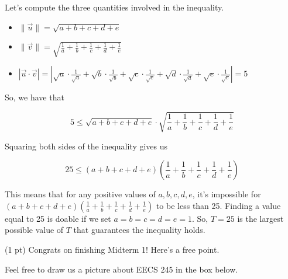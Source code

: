 \documentclass[11pt]{article}
\begin{document}
\begin{prob}
\begin{solution}
Let's compute the three quantities involved in the inequality.

\begin{itemize}
  \item $\lVert \vec u \rVert = \sqrt{a + b + c + d + e}$
  \item $\lVert \vec v \rVert = \sqrt{\frac{1}{a} + \frac{1}{b} + \frac{1}{c} + \frac{1}{d} + \frac{1}{e}}$
  \item $|\vec u \cdot \vec v| = |\sqrt{a} \cdot \frac{1}{\sqrt{a}} + \sqrt{b} \cdot \frac{1}{\sqrt{b}} + \sqrt{c} \cdot \frac{1}{\sqrt{c}} + \sqrt{d} \cdot \frac{1}{\sqrt{d}} + \sqrt{e} \cdot \frac{1}{\sqrt{e}}| = 5$
\end{itemize}

So, we have that

$$5 \leq \sqrt{a + b + c + d + e} \cdot \sqrt{\frac{1}{a} + \frac{1}{b} + \frac{1}{c} + \frac{1}{d} + \frac{1}{e}}$$

Squaring both sides of the inequality gives us

$$25 \leq (a + b + c + d + e) \left( \frac{1}{a} + \frac{1}{b} + \frac{1}{c} + \frac{1}{d} + \frac{1}{e} \right)$$

This means that for any positive values of $a, b, c, d, e$, it's impossible for $(a + b + c + d + e) \left( \frac{1}{a} + \frac{1}{b} + \frac{1}{c} + \frac{1}{d} + \frac{1}{e} \right)$ to be less than 25. Finding a value equal to 25 is doable if we set $a = b = c = d = e = 1$. So, $T = 25$ is the largest possible value of $T$ that guarantees the inequality holds.

\end{solution}

\end{prob}

\newpage

(1 pt) Congrats on finishing Midterm 1! Here's a free point.

Feel free to draw us a picture about EECS 245 in the box below. 

\emptybox{20cm}
\end{document}
